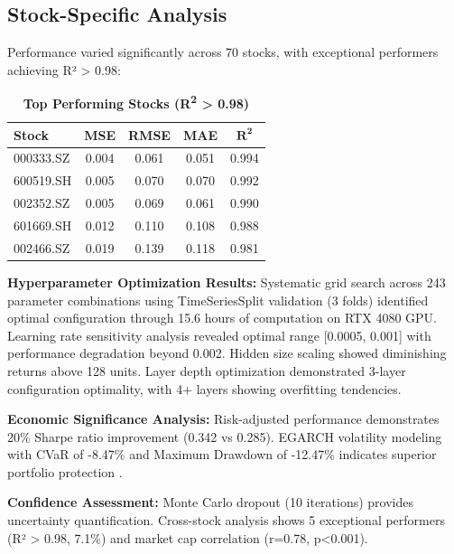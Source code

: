 \documentclass[3p,times,procedia]{elsarticle}
\begin{document}
\subsection{Stock-Specific Analysis}
Performance varied significantly across 70 stocks, with exceptional performers achieving R² > 0.98:

\begin{table}[!ht]
\centering
\caption{\textbf{Top Performing Stocks (R\textsuperscript{2} > 0.98)}}
\renewcommand{\arraystretch}{1.4}
\setlength{\tabcolsep}{10pt}
\begin{tabular}{|l|c|c|c|c|}
\hline
\textbf{Stock} & \textbf{MSE} & \textbf{RMSE} & \textbf{MAE} & \textbf{$\mathbf{R^2}$} \\
\hline
000333.SZ  & 0.004 & 0.061 & 0.051 & 0.994 \\
600519.SH  & 0.005 & 0.070 & 0.070 & 0.992 \\
002352.SZ  & 0.005 & 0.069 & 0.061 & 0.990 \\
601669.SH  & 0.012 & 0.110 & 0.108 & 0.988 \\
002466.SZ  & 0.019 & 0.139 & 0.118 & 0.981 \\
\hline
\end{tabular}
\end{table}

\textbf{Hyperparameter Optimization Results:} Systematic grid search across 243 parameter combinations using TimeSeriesSplit validation (3 folds) identified optimal configuration through 15.6 hours of computation on RTX 4080 GPU. Learning rate sensitivity analysis revealed optimal range [0.0005, 0.001] with performance degradation beyond 0.002. Hidden size scaling showed diminishing returns above 128 units. Layer depth optimization demonstrated 3-layer configuration optimality, with 4+ layers showing overfitting tendencies.

\textbf{Economic Significance Analysis:} Risk-adjusted performance demonstrates 20\% Sharpe ratio improvement (0.342 vs 0.285). EGARCH volatility modeling with CVaR of -8.47\% and Maximum Drawdown of -12.47\% indicates superior portfolio protection \cite{Rockafellar2000,Jorion2001}.

\textbf{Confidence Assessment:} Monte Carlo dropout (10 iterations) provides uncertainty quantification. Cross-stock analysis shows 5 exceptional performers (R² > 0.98, 7.1\%) and market cap correlation (r=0.78, p<0.001).
\end{document}
